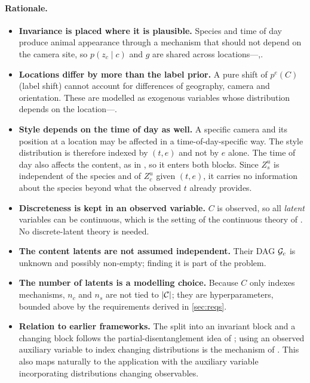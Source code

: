 \paragraph{Rationale.}
\begin{itemize}[leftmargin=1.5em]
\item \textbf{Invariance is placed where it is plausible.} Species and time of day produce animal
      appearance through a mechanism that should not depend on the camera site, so $p(z_c\mid c)$ and
      $g$ are shared across locations---,.
\item \textbf{Locations differ by more than the label prior.} A pure shift of $p^e(C)$ (label shift)
      cannot account for differences of geography, camera and orientation. These are modelled as
      exogenous variables whose distribution depends on the location---.
\item \textbf{Style depends on the time of day as well.} A specific camera and its position at a
      location may be affected in a time-of-day-specific way. The style distribution is therefore
      indexed by $(t,e)$ and not by $e$ alone. The time of day also affects the content,
      as in , so it enters both
      blocks. Since $Z_s^u$ is independent of the species and of $Z_c^u$ given $(t,e)$, it carries no
      information about the species beyond what the observed $t$ already provides.
\item \textbf{Discreteness is kept in an observed variable.} $C$ is observed, so all \emph{latent}
      variables can be continuous, which is the setting of the continuous theory of
      \cite{ng2025}. No discrete-latent theory is needed.
\item \textbf{The content latents are not assumed independent.} Their DAG $\mathcal{G}_c$ is unknown and
      possibly non-empty; finding it is part of the problem.
\item \textbf{The number of latents is a modelling choice.} Because $C$ only indexes mechanisms,
      $n_c$ and $n_s$ are not tied to $|\mathcal{C}|$; they are hyperparameters, bounded above by the
      requirements derived in \cref{sec:reqs}.
\item \textbf{Relation to earlier frameworks.} The split into an invariant block and a changing
      block follows the partial-disentanglement idea of \cite{kong2022}; using an observed auxiliary
      variable to index changing distributions is the mechanism of \cite{khemakhem2020}. This also maps
      naturally to the application with the auxiliary variable incorporating distributions changing
      observables.
\end{itemize}
